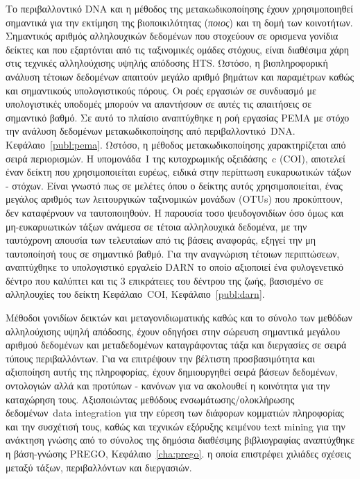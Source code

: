 \documentclass[master=elt, cleveref, autoref, masteroption=eg]{kulemt}
\begin{document}
\begin{abstract*}
   Το περιβαλλοντικό  \foreignlanguage{english}{DNA}  και η μέθοδος της μετακωδικοποίησης έχουν χρησιμοποιηθεί σημαντικά για την εκτίμηση της βιοποικιλότητας
   (\textit{ποιος}) και τη δομή των κοινοτήτων. 
   Σημαντικός αριθμός αλληλουχικών δεδομένων που στοχεύουν σε ορισμενα γονίδια δείκτες και που εξαρτόνται από τις ταξινομικές ομάδες στόχους, 
   είναι διαθέσιμα χάρη στις τεχνικές αλληλούχισης υψηλής απόδοσης \foreignlanguage{english}{HTS}. 
   Ωστόσο, η βιοπληροφορική ανάλυση τέτοιων δεδομένων απαιτούν μεγάλο αριθμό βημάτων και παραμέτρων καθώς και σημαντικούς υπολογιστικούς πόρους. 
   Οι ροές εργασιών σε συνδυασμό με υπολογιστικές υποδομές μπορούν να απαντήσουν σε αυτές τις απαιτήσεις σε σημαντικό βαθμό. 
   Σε αυτό το πλαίσιο αναπτύχθηκε η ροή εργασίας \foreignlanguage{english}{PEMA} με στόχο την ανάλυση δεδομένων μετακωδικοποίησης από περιβαλλοντικό~\foreignlanguage{english}{DNA}.
   Κεφάλαιο~\foreignlanguage{english}{\ref{publ:pema}}.
   Ωστόσο, η μέθοδος μετακωδικοποίησης χαρακτηρίζεται από σειρά περιορισμών. 
   Η υπομονάδα~\foreignlanguage{english}{I} της κυτοχρωμικής οξειδάσης~\foreignlanguage{english}{c (COI)}, αποτελεί έναν δείκτη 
   που χρησιμοποιείται ευρέως, ειδικά στην περίπτωση ευκαρυωτικών τάξων - στόχων. 
   Είναι γνωστό πως σε μελέτες όπου ο δείκτης αυτός χρησιμοποιείται, ένας μεγάλος αριθμός των λειτουργικών 
   ταξινομικών μονάδων \foreignlanguage{english}{(OTUs)} που προκύπτουν, δεν καταφέρνουν να ταυτοποιηθούν. 
   Η παρουσία τοσο ψευδογονιδίων όσο όμως και μη-ευκαρυωτικών τάξων ανάμεσα σε τέτοια αλληλουχικά δεδομένα,
   με την ταυτόχρονη απουσία των τελευταίων από τις βάσεις αναφοράς, εξηγεί την μη ταυτοποίησή τους σε σημαντικό βαθμό. 
   Για την αναγνώριση τέτοιων περιπτώσεων, αναπτύχθηκε το υπολογιστικό εργαλείο \foreignlanguage{english}{DARN} το οποίο 
   αξιοποιεί ένα φυλογενετικό δέντρο που καλύπτει και τις 3 επικράτειες του δέντρου της ζωής, βασισμένο σε αλληλουχίες του 
   δείκτη Κεφάλαιο~\foreignlanguage{english}{COI}, Κεφάλαιο~\foreignlanguage{english}{\ref{publ:darn}}.

   Μέθοδοι γονιδίων δεικτών και μεταγονιδιωματικής καθώς και το σύνολο των μεθόδων αλληλούχισης υψηλή απόδοσης, 
   έχουν οδηγήσει στην σώρευση σημαντικά μεγάλου αριθμού δεδομένων και μεταδεδομένων 
   καταγράφοντας τάξα και διεργασίες σε σειρά τύπους περιβαλλόντων.
   Για να επιτρέψουν την βέλτιστη προσβασιμότητα και αξιοποίηση αυτής της πληροφορίας,
   έχουν δημιουργηθεί
   σειρά βάσεων δεδομένων, οντολογιών αλλά και προτύπων - κανόνων για να ακολουθεί η κοινότητα 
   για την καταχώρηση τους.
   Αξιοποιώντας μεθόδους ενσωμάτωσης/ολοκλήρωσης δεδομένων~\foreignlanguage{english}{data integration} για 
   την εύρεση των διάφορων κομματιών πληροφορίας και την συσχέτισή τους, καθώς και τεχνικών εξόρυξης κειμένου
   \foreignlanguage{english}{text mining} για την ανάκτηση γνώσης από το σύνολος της δημόσια διαθέσιμης βιβλιογραφίας
   αναπτύχθηκε η βάση-γνώσης \foreignlanguage{english}{PREGO}, Κεφάλαιο~\foreignlanguage{english}{\ref{cha:prego}}.
   η οποία επιστρέφει χιλιάδες σχέσεις μεταξύ τάξων, περιβαλλόντων και διεργασιών. 



\end{abstract*}
\end{document}
